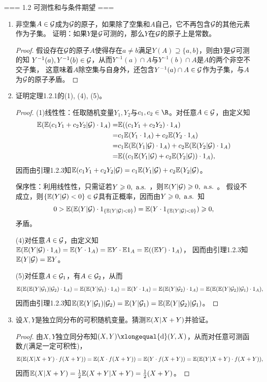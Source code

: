 === 1.2 可测性和与条件期望 ===
\begin{enumerate}
    \item[1.2.1] 非空集$A\in\mathcal{G}$成为$\mathcal{G}$的原子，如果除了空集和$A$自己，它不再包含$\mathcal{G}$的其他元素作为子集。
    证明：如果$Y$是$\mathcal{G}$可测的，那么$Y$在$\mathcal{G}$的原子上是常数。
    \begin{proof}
        假设存在$\mathcal{G}$的原子$A$使得存在$a\neq b$满足$Y(A)\supseteq\{a,b\}$，则由$Y$是$\mathcal{G}$可测的知
        $Y^{-1}(a),Y^{-1}(b)\in\mathcal{G}$，从而$Y^{-1}(a)\cap A$与$Y^{-1}(b)\cap A$是$A$的两个非空不交子集，
        这意味着$A$除空集与自身外，还包含$Y^{-1}(a)\cap A\in\mathcal{G}$作为子集，与$A$为$\mathcal{G}$的原子矛盾。
    \end{proof}
    \item[1.2.3] 证明定理1.2.1的(1), (4), (5)。
    \begin{proof}
        (1)线性性：任取随机变量$Y_1,Y_2$与$c_1,c_2\in\R$。对任意$A\in\mathcal{G}$，由定义知
        \begin{align*}
            \mathbb{E}(\mathbb{E}(c_1Y_1+c_2Y_2|\mathcal{G})\cdot1_A)=&\mathbb{E}((c_1Y_1+c_2Y_2)\cdot1_A)\\
            =&c_1\mathbb{E}(Y_1\cdot1_A)+c_2\mathbb{E}(Y_2\cdot1_A)\\
            =&c_1\mathbb{E}(\mathbb{E}(Y_1|\mathcal{G})\cdot1_A)+c_2\mathbb{E}(\mathbb{E}(Y_2|\mathcal{G})\cdot1_A)\\
            =&\mathbb{E}((c_1\mathbb{E}(Y_1|\mathcal{G})+c_2\mathbb{E}(Y_2|\mathcal{G}))\cdot1_A),
        \end{align*}
        因而由引理1.2.3知$\mathbb{E}(c_1Y_1+c_2Y_2|\mathcal{G})=c_1\mathbb{E}(Y_1|\mathcal{G})+c_2\mathbb{E}(Y_2|\mathcal{G})$。

        保序性：利用线性性，只需证若$Y\geqslant0,\text{ a.s. }$，则$\mathbb{E}(Y|\mathcal{G})\geqslant0,\text{ a.s. }$。
        假设不成立，则$\{\mathbb{E}(Y|\mathcal{G})<0\}\in\mathcal{G}$具有正概率，因而由$Y\geqslant0,\text{ a.s. }$知
        \[0>\mathbb{E}(\mathbb{E}(Y|\mathcal{G})\cdot1_{\{\mathbb{E}(Y|\mathcal{G})<0\}})=\mathbb{E}(Y\cdot1_{\{\mathbb{E}(Y|\mathcal{G})<0\}})\geqslant0,\]矛盾。

        (4)对任意$A\in\mathcal{G}$，由定义知$\mathbb{E}(\mathbb{E}(Y|\mathcal{G})\cdot1_A)=\mathbb{E}(Y\cdot1_A)=\mathbb{E} Y\cdot\mathbb{E}1_A=\mathbb{E}((\mathbb{E} Y)\cdot1_A)$，
        因而由引理1.2.3知$\mathbb{E}(Y|\mathcal{G})=\mathbb{E} Y$。

        (5)对任意$A\in\mathcal{G}_1$，有$A\in\mathcal{G}_2$，从而
        \[\mathbb{E}(\mathbb{E}(\mathbb{E}(Y|\mathcal{G}_1)|\mathcal{G}_2)\cdot1_A)=\mathbb{E}(\mathbb{E}(Y|\mathcal{G}_1)\cdot1_A)=\mathbb{E}(Y\cdot1_A)=\mathbb{E}(\mathbb{E}(Y|\mathcal{G}_2)\cdot1_A)=\mathbb{E}(\mathbb{E}(\mathbb{E}(Y|\mathcal{G}_2)|\mathcal{G}_1)\cdot1_A),\]
        因而由引理1.2.3知$\mathbb{E}(\mathbb{E}(Y|\mathcal{G}_1)|\mathcal{G}_2)=\mathbb{E}(Y|\mathcal{G}_1)=\mathbb{E}(\mathbb{E}(Y|\mathcal{G}_2)|\mathcal{G}_1)$。
    \end{proof}
    \item[1.2.4] 设$X,Y$是独立同分布的可积随机变量。猜测$\mathbb{E}(X|X+Y)$并验证。
    \begin{proof}
        由$X,Y$独立同分布知$(X,Y)\xlongequal{\text{d}}(Y,X)$，从而对任意可测函数$f$(满足一定可积性)，
        \[\mathbb{E}(\mathbb{E}(X|X+Y)\cdot f(X+Y))=\mathbb{E}(X\cdot f(X+Y))=\mathbb{E}(Y\cdot f(X+Y))=\mathbb{E}(\mathbb{E}(Y|X+Y)\cdot f(X+Y)),\]
        因而$\mathbb{E}(X|X+Y)=\frac{1}{2}\mathbb{E}(X+Y|X+Y)=\frac{1}{2}(X+Y)$。
    \end{proof}
\end{enumerate}

